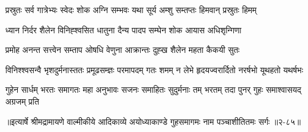 \twolineshloka
{प्रस्रुतः सर्व गात्रेभ्यः स्वेदः शोक अग्नि सम्भवः}
{यथा सूर्य अम्शु सम्तप्तः हिमवान् प्रस्रुतः हिमम्} %

\twolineshloka
{ध्यान निर्दर शैलेन विनिह्श्वसित धातुना}
{दैन्य पादप सम्घेन शोक आयास अधिशृन्गिणा} %

\twolineshloka
{प्रमोह अनन्त सत्त्वेन सम्ताप ओषधि वेणुना}
{आक्रान्तः दुह्ख शैलेन महता कैकयी सुतः} %

\fourlineindentedshloka
{विनिश्श्वसन्वै भृशदुर्मनास्ततः}
{प्रमूढसम्ज्ञः परमापदम् गतः}
{शमम् न लेभे हृदयज्वरार्दितो}
{नरर्षभो यूथहतो यथर्षभः} %

\fourlineindentedshloka
{गुहेन सार्धम् भरतः समागतः}
{महा अनुभावः सजनः समाहितः}
{सुदुर्मनाः तम् भरतम् तदा पुनर्}
{गुहः समाश्वासयद् अग्रजम् प्रति} %


॥इत्यार्षे श्रीमद्रामायणे वाल्मीकीये आदिकाव्ये अयोध्याकाण्डे गुहसमागमः नाम पञ्चाशीतितमः सर्गः ॥२-८५॥
